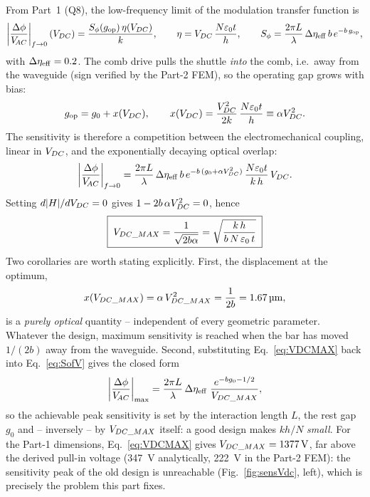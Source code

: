 From Part~1 (Q8), the low-frequency limit of the modulation transfer function is
\begin{equation}
  \left|\frac{\Delta\phi}{V_{\!AC}}\right|_{f\to0}(V_{DC})
   = \frac{S_{\phi}(g_{\mathrm{op}})\,\eta(V_{DC})}{k},\qquad
  \eta=V_{DC}\,\frac{N\varepsilon_{0}t}{h},\qquad
  S_{\phi}=\frac{2\pi L}{\lambda}\,\Delta\eta_{\mathrm{eff}}\,b\,e^{-b\,g_{\mathrm{op}}},
\end{equation}
with $\Delta\eta_{\mathrm{eff}}=0.2$. The comb drive pulls the shuttle \emph{into} the comb,
i.e.\ away from the waveguide (sign verified by the Part-2 FEM), so the
operating gap grows with bias:
\begin{equation}
  g_{\mathrm{op}}=g_{0}+x(V_{DC}),\qquad
  x(V_{DC})=\frac{V_{DC}^{2}}{2k}\,\frac{N\varepsilon_{0}t}{h}\equiv\alpha V_{DC}^{2}.
\end{equation}
The sensitivity is therefore a competition between the electromechanical
coupling, linear in $V_{DC}$, and the exponentially decaying optical overlap:
\begin{equation}
  \left|\frac{\Delta\phi}{V_{\!AC}}\right|_{f\to0}
  = \frac{2\pi L}{\lambda}\,\Delta\eta_{\mathrm{eff}}\, b\,
    e^{-b\,(g_{0}+\alpha V_{DC}^{2})}\,\frac{N\varepsilon_{0}t}{k\,h}\,V_{DC} .
  \label{eq:SofV}
\end{equation}
Setting $d|H|/dV_{DC}=0$ gives $1-2b\,\alpha V_{DC}^{2}=0$, hence
\begin{equation}
  \boxed{\;V_{DC\_MAX}=\frac{1}{\sqrt{2b\alpha}}
         =\sqrt{\frac{k\,h}{b\,N\,\varepsilon_{0}\,t}}\;}
  \label{eq:VDCMAX}
\end{equation}
Two corollaries are worth stating explicitly. First, the displacement at the
optimum,
\begin{equation}
  x(V_{DC\_MAX})=\alpha\,V_{DC\_MAX}^{2}=\frac{1}{2b}=\SI{1.67}{\micro\meter},
  \label{eq:xopt}
\end{equation}
is a \emph{purely optical} quantity -- independent of every geometric
parameter. Whatever the design, maximum sensitivity is reached when the bar
has moved $1/(2b)$ away from the waveguide. Second, substituting
Eq.~\ref{eq:VDCMAX} back into Eq.~\ref{eq:SofV} gives the closed form
\begin{equation}
  \left|\frac{\Delta\phi}{V_{\!AC}}\right|_{\mathrm{max}}
  = \frac{2\pi L}{\lambda}\,\Delta\eta_{\mathrm{eff}}\;\frac{e^{-b g_{0}-1/2}}{V_{DC\_MAX}},
  \label{eq:Smax}
\end{equation}
so the achievable peak sensitivity is set by the interaction length $L$, the
rest gap $g_{0}$ and -- inversely -- by $V_{DC\_MAX}$ itself: a good design makes
$kh/N$ \emph{small}. For the Part-1 dimensions, Eq.~\ref{eq:VDCMAX} gives
$V_{DC\_MAX}=\SI{1377}{\volt}$, far above the derived pull-in voltage
(\SI{347}{\volt} analytically, \SI{222}{\volt} in the Part-2 FEM): the
sensitivity peak of the old design is unreachable
(Fig.~\ref{fig:sensVdc}, left), which is precisely the problem this part
fixes.

